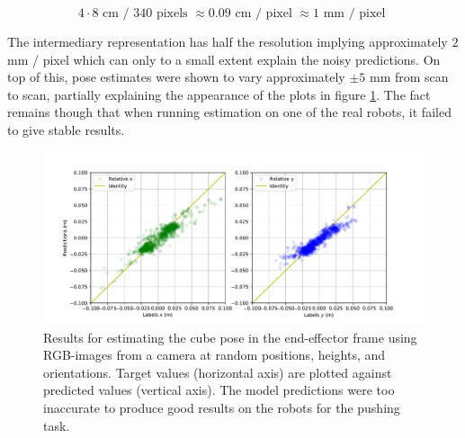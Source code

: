 \begin{equation}
    4 \cdot 8 \text{ cm / } 340 \text{ pixels } \approx 0.09 \text{ cm / pixel } \approx 1 \text{ mm / pixel }
\end{equation}

The intermediary representation has half the resolution implying approximately
$2$ mm / pixel which can only to a small extent explain the noisy predictions.
On top of this, pose estimates were shown to vary approximately $\pm 5$ mm from
scan to scan, partially explaining the appearance of the plots in figure
\ref{fig:relpose_end2end_results}. The fact remains though that when running
estimation on one of the real robots, it failed to give stable results.

\begin{figure}[h!]
    \centering
    \includegraphics[width=0.8 \textwidth]{res/results_relative_pose_end2end.pdf}

    \caption{Results for estimating the cube pose in the end-effector frame using
    RGB-images from a camera at random positions, heights, and orientations. Target values
    (horizontal axis) are plotted against predicted values (vertical axis). The model
    predictions were too inaccurate to produce good results on the robots for the
    pushing task.}

    \label{fig:relpose_end2end_results}
    
\end{figure}

